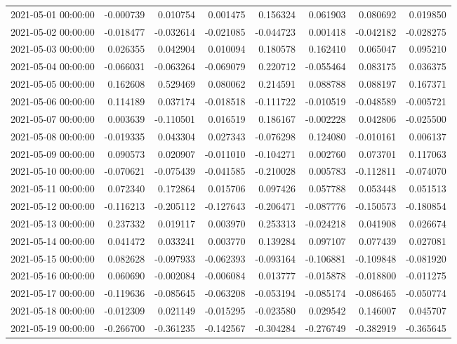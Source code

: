 \begin{tabular}{lrrrrrrr}
2021-05-01 00:00:00 & -0.000739 & 0.010754 & 0.001475 & 0.156324 & 0.061903 & 0.080692 & 0.019850 \\
2021-05-02 00:00:00 & -0.018477 & -0.032614 & -0.021085 & -0.044723 & 0.001418 & -0.042182 & -0.028275 \\
2021-05-03 00:00:00 & 0.026355 & 0.042904 & 0.010094 & 0.180578 & 0.162410 & 0.065047 & 0.095210 \\
2021-05-04 00:00:00 & -0.066031 & -0.063264 & -0.069079 & 0.220712 & -0.055464 & 0.083175 & 0.036375 \\
2021-05-05 00:00:00 & 0.162608 & 0.529469 & 0.080062 & 0.214591 & 0.088788 & 0.088197 & 0.167371 \\
2021-05-06 00:00:00 & 0.114189 & 0.037174 & -0.018518 & -0.111722 & -0.010519 & -0.048589 & -0.005721 \\
2021-05-07 00:00:00 & 0.003639 & -0.110501 & 0.016519 & 0.186167 & -0.002228 & 0.042806 & -0.025500 \\
2021-05-08 00:00:00 & -0.019335 & 0.043304 & 0.027343 & -0.076298 & 0.124080 & -0.010161 & 0.006137 \\
2021-05-09 00:00:00 & 0.090573 & 0.020907 & -0.011010 & -0.104271 & 0.002760 & 0.073701 & 0.117063 \\
2021-05-10 00:00:00 & -0.070621 & -0.075439 & -0.041585 & -0.210028 & 0.005783 & -0.112811 & -0.074070 \\
2021-05-11 00:00:00 & 0.072340 & 0.172864 & 0.015706 & 0.097426 & 0.057788 & 0.053448 & 0.051513 \\
2021-05-12 00:00:00 & -0.116213 & -0.205112 & -0.127643 & -0.206471 & -0.087776 & -0.150573 & -0.180854 \\
2021-05-13 00:00:00 & 0.237332 & 0.019117 & 0.003970 & 0.253313 & -0.024218 & 0.041908 & 0.026674 \\
2021-05-14 00:00:00 & 0.041472 & 0.033241 & 0.003770 & 0.139284 & 0.097107 & 0.077439 & 0.027081 \\
2021-05-15 00:00:00 & 0.082628 & -0.097933 & -0.062393 & -0.093164 & -0.106881 & -0.109848 & -0.081920 \\
2021-05-16 00:00:00 & 0.060690 & -0.002084 & -0.006084 & 0.013777 & -0.015878 & -0.018800 & -0.011275 \\
2021-05-17 00:00:00 & -0.119636 & -0.085645 & -0.063208 & -0.053194 & -0.085174 & -0.086465 & -0.050774 \\
2021-05-18 00:00:00 & -0.012309 & 0.021149 & -0.015295 & -0.023580 & 0.029542 & 0.146007 & 0.045707 \\
2021-05-19 00:00:00 & -0.266700 & -0.361235 & -0.142567 & -0.304284 & -0.276749 & -0.382919 & -0.365645 \\

\end{tabular}
